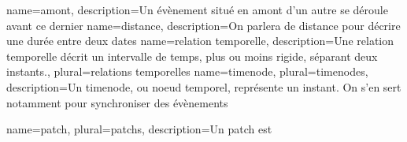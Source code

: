 {
    name=amont,
    description={Un évènement situé en amont d'un autre se déroule avant ce dernier}
}
{
    name=distance,
    description={On parlera de distance pour décrire une durée entre deux dates}
}
{
  name={relation temporelle},
  description={Une relation temporelle décrit un intervalle de temps, plus ou moins rigide, séparant deux instants.},
  plural={relations temporelles}
}
{
  name={timenode},
  plural={timenodes},
  description={Un timenode, ou noeud temporel, représente un instant. On s'en sert notamment pour synchroniser des évènements}
}

{
  name={patch},
  plural={patchs},
  description={Un patch est }
}








